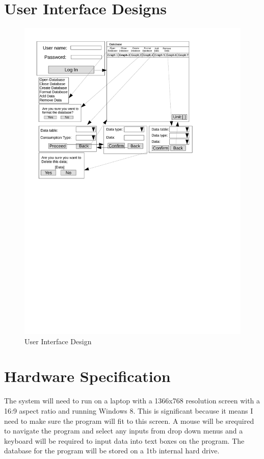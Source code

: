 \section{User Interface Designs}
\begin{landscape}
\begin{figure}[H]
\includegraphics{./design/User Interface Design.pdf}
\caption{User Interface Design}
\end{figure}
\end{landscape}

\section{Hardware Specification}
The system will need to run on a laptop with a 1366x768 resolution screen with a 16:9  aspect ratio and running Windows 8. This is significant because it means I need to make sure the program will fit to this screen. A mouse will be srequired to navigate the program and select any inputs from drop down menus and a keyboard will be required to input data into text boxes on the program. The database for the program will be stored on a 1tb internal hard drive.
